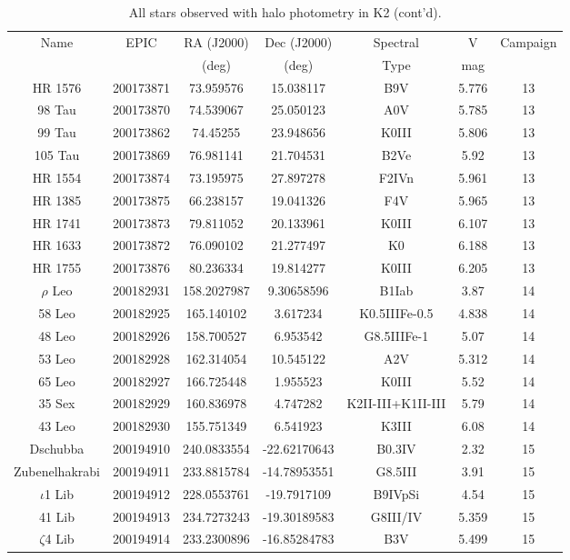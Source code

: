 \begin{table*}
\caption{All stars observed with halo photometry in K2 (cont'd).}
\begin{tabular}{ccccccc}
\hline \hline
Name & EPIC & RA (J2000) & Dec (J2000) & Spectral & V & Campaign \\
 &  & (deg) & (deg) & Type & mag &  \\
\hline
HR 1576 & 200173871 & 73.959576 & 15.038117 & B9V & 5.776 & 13 \\
98 Tau & 200173870 & 74.539067 & 25.050123 & A0V & 5.785 & 13 \\
99 Tau & 200173862 & 74.45255 & 23.948656 & K0III & 5.806 & 13 \\
105 Tau & 200173869 & 76.981141 & 21.704531 & B2Ve & 5.92 & 13 \\
HR 1554 & 200173874 & 73.195975 & 27.897278 & F2IVn & 5.961 & 13 \\
HR 1385 & 200173875 & 66.238157 & 19.041326 & F4V & 5.965 & 13 \\
HR 1741 & 200173873 & 79.811052 & 20.133961 & K0III & 6.107 & 13 \\
HR 1633 & 200173872 & 76.090102 & 21.277497 & K0 & 6.188 & 13 \\
HR 1755 & 200173876 & 80.236334 & 19.814277 & K0III & 6.205 & 13 \\
$\rho$ Leo & 200182931 & 158.2027987 & 9.30658596 & B1Iab & 3.87 & 14 \\
58 Leo & 200182925 & 165.140102 & 3.617234 & K0.5IIIFe-0.5 & 4.838 & 14 \\
48 Leo & 200182926 & 158.700527 & 6.953542 & G8.5IIIFe-1 & 5.07 & 14 \\
53 Leo & 200182928 & 162.314054 & 10.545122 & A2V & 5.312 & 14 \\
65 Leo & 200182927 & 166.725448 & 1.955523 & K0III & 5.52 & 14 \\
35 Sex & 200182929 & 160.836978 & 4.747282 & K2II-III+K1II-III & 5.79 & 14 \\
43 Leo & 200182930 & 155.751349 & 6.541923 & K3III & 6.08 & 14 \\
Dschubba & 200194910 & 240.0833554 & -22.62170643 & B0.3IV & 2.32 & 15 \\
Zubenelhakrabi & 200194911 & 233.8815784 & -14.78953551 & G8.5III & 3.91 & 15 \\
$\iota$1 Lib & 200194912 & 228.0553761 & -19.7917109 & B9IVpSi & 4.54 & 15 \\
41 Lib & 200194913 & 234.7273243 & -19.30189583 & G8III/IV & 5.359 & 15 \\
$\zeta$4 Lib & 200194914 & 233.2300896 & -16.85284783 & B3V & 5.499 & 15 \\

\end{tabular}
\end{table*}
